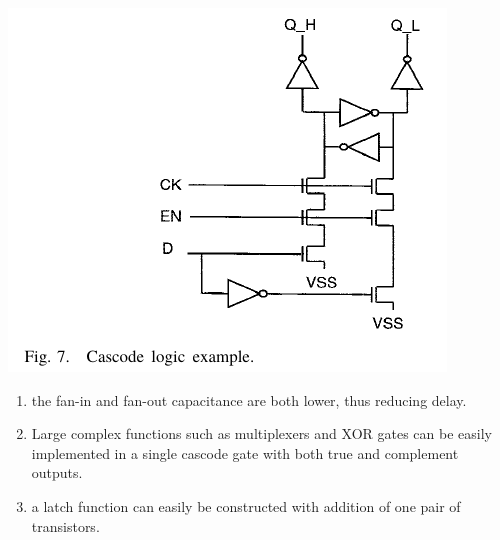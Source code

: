 \documentclass[11pt]{article}
\begin{document}
\begin{enumerate}
	\begin{center}
		\includegraphics[scale=0.5]{cascode.png}	
	\end{center}
	\begin{enumerate}
		\item the fan-in and fan-out capacitance are both lower, thus reducing delay.
		\item Large complex functions such as multiplexers and XOR gates can be easily implemented in a single cascode gate with both true and complement outputs.
		\item a latch function can easily be constructed with addition of one pair of transistors.
	\end{enumerate}
\end{enumerate}
\end{document}
